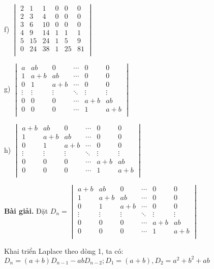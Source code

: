 \documentclass[12pt]{report}
\begin{document}
f) $\begin{vmatrix}
	2 & 1 & 1 & 0 & 0 & 0 \\
	2 & 3 & 4 & 0 & 0 & 0 \\
	3 & 6 & 10 & 0 & 0 & 0 \\
	4 & 9 & 14 & 1 & 1 & 1 \\
	5 & 15 & 24 & 1 & 5 & 9 \\
	0 & 24 & 38 & 1 & 25 & 81 \\
\end{vmatrix}$

g) $\begin{vmatrix}
	a & ab & 0 & \cdots & 0 & 0 \\
	1 & a+b & ab & \cdots & 0 & 0 \\
	0 & 1 & a+b & \cdots & 0 & 0 \\
	\vdots & \vdots & \vdots & \ddots & \vdots & \vdots \\
	0 & 0 & 0 & \cdots & a+b & ab \\
	0 & 0 & 0 & \cdots & 1 & a+b \\
\end{vmatrix}$

h) $\begin{vmatrix}
	a+b & ab & 0 & \cdots & 0 & 0 \\
	1 & a+b & ab & \cdots & 0 & 0 \\
	0 & 1 & a+b & \cdots & 0 & 0 \\
	\vdots & \vdots & \vdots & \ddots & \vdots & \vdots \\
	0 & 0 & 0 & \cdots & a+b & ab \\
	0 & 0 & 0 & \cdots & 1 & a+b \\
\end{vmatrix}$

\textbf{Bài giải.} Đặt $D_n = \begin{vmatrix}
	a+b & ab & 0 & \cdots & 0 & 0 \\
	1 & a+b & ab & \cdots & 0 & 0 \\
	0 & 1 & a+b & \cdots & 0 & 0 \\
	\vdots & \vdots & \vdots & \ddots & \vdots & \vdots \\
	0 & 0 & 0 & \cdots & a+b & ab \\
	0 & 0 & 0 & \cdots & 1 & a+b \\
\end{vmatrix}$

Khai triển Laplace theo dòng 1, ta có: $D_n = (a+b)D_{n-1} - ab D_{n-2}; D_1 = (a+b), D_2 = a^2+b^2+ab$
\end{document}
